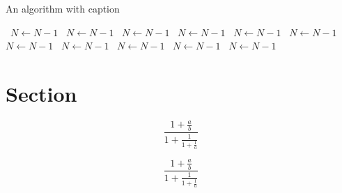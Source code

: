 \documentclass[a4paper]{article}
\begin{document}
\begin{algorithm}
\caption{An algorithm with caption}
\begin{algorithmic}
\    \State $N \gets N - 1$
\    \State $N \gets N - 1$
\    \State $N \gets N - 1$
\    \State $N \gets N - 1$
\    \State $N \gets N - 1$
\    \State $N \gets N - 1$
\    \State $N \gets N - 1$
\    \State $N \gets N - 1$
\    \State $N \gets N - 1$
\    \State $N \gets N - 1$
\    \State $N \gets N - 1$
\EndWhile
\end{algorithmic}
\end{algorithm}

\section{Section}

\[ \frac{1+\frac{a}{b}}{1+\frac{1}{1+\frac{1}{a}}} \]

\[ \frac{1+\frac{a}{b}}{1+\frac{1}{1+\frac{1}{a}}} \]
\end{document}
